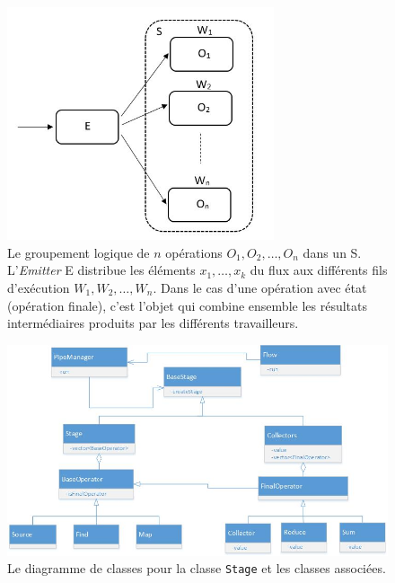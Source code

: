\begin{figure}
\centering
     \includegraphics[width=0.7\textwidth]{Figures/Stages.jpg}
      \caption[Le groupement logique de $n$ op\'erations $O_1, O_2, \ldots, O_n$ dans un  S.]{Le groupement logique de $n$ op\'erations $O_1, O_2, \ldots, O_n$ dans un  S.  L'\emph{Emitter} E distribue les \'el\'ements $x_1, \ldots, x_k$ du flux aux diff\'erents fils d'ex\'ecution $W_1, W_2, \ldots, W_n$. Dans le cas d'une op\'eration avec \'etat (op\'eration finale), c'est l'objet  qui combine ensemble les r\'esultats interm\'ediaires produits par les diff\'erents travailleurs.}
       \label{Stages.fig}
\end{figure}

\begin{figure}
\centering
     \includegraphics[width=1.0\textwidth]{Figures/StagesClassDiagramme.jpg}
      \caption{Le diagramme de classes pour la classe \texttt{Stage} et les classes associ\'ees.}
       \label{StagesClassDiagramme.fig}
\end{figure}



